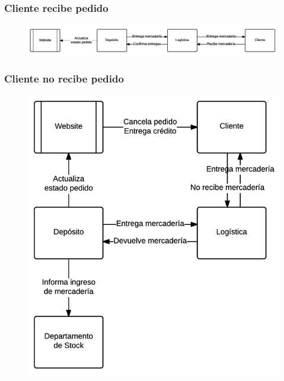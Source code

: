 \subsubsection{Cliente recibe pedido}
\begin{figure}[H]
  \includegraphics[width=\linewidth]{images/cliente-recibe-pedido.png}
\end{figure}

\clearpage
\subsubsection{Cliente no recibe pedido}
\begin{figure}[H]
  \includegraphics[width=\linewidth]{images/cliente-no-recibe-pedido.png}
\end{figure}

\clearpage
